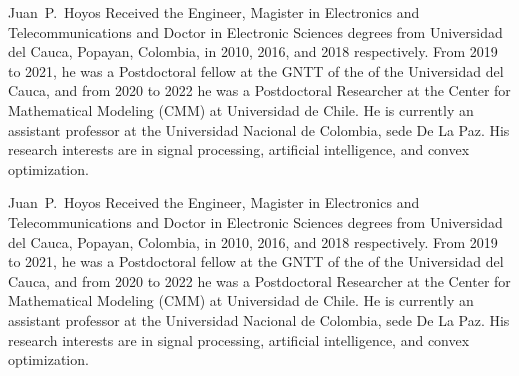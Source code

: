 \documentclass[lettersize, journal]{IEEEtran}
\begin{document}
\vspace{-2.5cm}
\begin{IEEEbiography}{Juan~P.~Hoyos}
Received the Engineer, Magister in Electronics and Telecommunications and Doctor in Electronic Sciences degrees from Universidad del Cauca, Popayan, Colombia, in 2010, 2016, and 2018 respectively. From 2019 to 2021, he was a Postdoctoral fellow at the GNTT of the of the Universidad del Cauca, and from 2020 to 2022 he was a Postdoctoral Researcher at the Center for Mathematical Modeling (CMM) at Universidad de Chile. He is currently an assistant professor at the Universidad Nacional de Colombia, sede De La Paz. His research interests are in signal processing, artificial intelligence, and convex optimization.
\end{IEEEbiography}
\vspace{-2.5cm}
\begin{IEEEbiography}{Juan~P.~Hoyos}
Received the Engineer, Magister in Electronics and Telecommunications and Doctor in Electronic Sciences degrees from Universidad del Cauca, Popayan, Colombia, in 2010, 2016, and 2018 respectively. From 2019 to 2021, he was a Postdoctoral fellow at the GNTT of the of the Universidad del Cauca, and from 2020 to 2022 he was a Postdoctoral Researcher at the Center for Mathematical Modeling (CMM) at Universidad de Chile. He is currently an assistant professor at the Universidad Nacional de Colombia, sede De La Paz. His research interests are in signal processing, artificial intelligence, and convex optimization.
\end{IEEEbiography}
\end{document}
